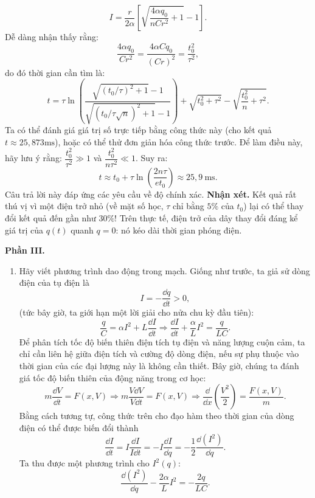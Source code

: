 \begin{loigiai}
\begin{enumerate}[1)]
    \[I=\dfrac{r}{2 \alpha}\left[\sqrt{\dfrac{4 \alpha q_{0}}{n C r^{2}}+1}-1\right].\]
    Dễ dàng nhận thấy rằng:
    \[\dfrac{4 \alpha q_{0}}{C r^{2}}=\dfrac{4 \alpha C q_{0}}{(C r)^{2}}=\dfrac{t_{0}^{2}}{\tau^{2}},\]
    do đó thời gian cần tìm là:
    \[t=\tau \ln \left(\dfrac{\sqrt{\left(t_{0} / \tau\right)^{2}+1}-1}{\sqrt{\left(t_{0} / \tau \sqrt{n}\right)^{2}+1}-1}\right)+\sqrt{t_{0}^{2}+\tau^{2}}-\sqrt{\dfrac{t_{0}^{2}}{n}+\tau^{2}}.\]
    Ta có thể đánh giá giá trị số trực tiếp bằng công thức này (cho kết quả $t \approx 25,873 \mathrm{ms}$), hoặc  có thể thử đơn giản hóa công thức trước. Để làm điều này, hãy lưu ý rằng: $\dfrac{t_{0}^{2}}{\tau^{2}} \gg 1$ và $\dfrac{t_{0}^{2}}{n \tau^{2}} \ll 1$. Suy ra:
    \[t \approx t_{0} + \tau \ln \left(\dfrac{2 n \tau}{e t_{0}}\right) \approx 25,9 \mathrm{~ms}.\]
    Câu trả lời này đáp ứng các yêu cầu về độ chính xác.
    \textbf{Nhận xét.} Kết quả rất thú vị vì một điện trở nhỏ (về mặt số học, $\tau$  chỉ bằng $5\%$ của $t_0$) lại có thể thay đổi kết quả đến gần như $30\%$! Trên thực tế, điện trở của dây thay đổi đáng kể giá trị của $q(t)$ quanh $q=0$: nó kéo dài thời gian phóng điện.
\end{enumerate}
\begin{center}
    \bf Phần III.
\end{center}
\begin{enumerate}[1)]
    \item Hãy viết phương trình dao động trong mạch. Giống như trước, ta giả sử dòng điện của tụ điện là
    \[I = -\dfrac{\dd q}{\dd t}>0,\]
    (tức bây giờ, ta giới hạn một lời giải cho nửa chu kỳ đầu tiên):
    \[\dfrac{q}{C}=\alpha I^{2}+L \dfrac{\dd I}{\dd t} \Rightarrow \dfrac{\dd I}{\dd t}+\dfrac{\alpha}{L} I^{2}=\dfrac{q}{L C}.\]
    Để phân tích tốc độ biến thiên điện tích tụ điện và năng lượng cuộn cảm, ta chỉ cần liên hệ giữa điện tích và cường độ dòng điện, nếu sự phụ thuộc vào thời gian của các đại lượng này là không cần thiết. Bây giờ, chúng ta đánh giá tốc độ biến thiên của động năng trong cơ học:
    \[m \dfrac{\dd V}{\dd t} = F(x, V) \Rightarrow m \dfrac{V \dd V}{V \dd t} = F(x, V) \Rightarrow \dfrac{\dd}{\dd x}\left(\dfrac{V^{2}}{2}\right)=\dfrac{F(x, V)}{m}.\]
    Bằng cách tương tự, công thức trên cho đạo hàm theo thời gian của dòng điện có thể được biến đổi thành
    \[\dfrac{\dd I}{\dd t}=I \dfrac{\dd I}{I \dd t}=-I \dfrac{\dd I}{\dd q}=-\dfrac{1}{2} \dfrac{\dd\left(I^{2}\right)}{\dd q}.\]
    Ta thu được một phương trình cho $I^{2}(q)$:
    \[\dfrac{\dd\left(I^{2}\right)}{\dd q}-\dfrac{2 \alpha}{L} I^{2}=-\dfrac{2 q}{L C}.\]

\end{enumerate}
\end{loigiai}
